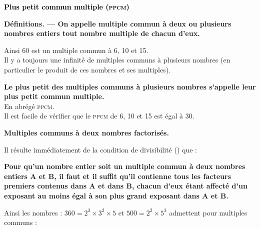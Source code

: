 \usepackage{amsmath,bm}
\usepackage[tikz]{bclogo}





\newcommand{\titre}[1]{\begin{center}{\Large\textcolor{Black}{#1}}\end{center}}

\newcommand{\paragraphe}[1]{\large\textcolor{blue}{#1}}

\newcommand{\NBVert}[1]{\large\textcolor{DarkGreen}{#1}}

\newcommand{\Attention}[3]{
\begin{bclogo}[%
barre = none,
couleurBord=white,%
logo=\bcattention,%
margeG = -1,%
margeD = 1,%
marge = 15%
]{\textcolor{#1}{$\quad$ #2}}
#3
\end {bclogo}
}

\titre{\bf Plus petit commun multiple (\textsc{ppcm})}
 

\textbf{Définitions. — On appelle multiple commun à deux ou plusieurs nombres entiers tout nombre multiple de chacun d'eux.} 

Ainsi 60 est un multiple commun à 6, 10 et 15. \\
Il y a toujours une infinité de multiples communs à plusieurs nombres (en particulier le produit de ces nombres et ses multiples).

\textbf{ Le plus petit des multiples communs à plusieurs nombres s'appelle leur plus petit commun multiple.}\\ 
En abrégé \textsc{ppcm}.\\
 Il est facile de vérifier que le  \textsc{ppcm} de 6, 10 et 15 est égal à 30. 
 
\textbf{ Multiples communs à deux nombres factorisés.} \label{Multiples_communs}

 Il résulte immédiatement de la condition de divisibilité (\label{Quotient_exact}) que : 
 
\textbf{  Pour qu'un nombre entier soit un multiple commun à deux nombres entiers A et B, il faut et il suffit qu'il contienne tous les facteurs premiers contenus dans A et dans B, chacun d'eux étant affecté d'un exposant au moins égal à son plus grand exposant dans A et B. } 

Ainsi les nombres : $360 =2^3 \times 3^2 \times  5$  et $500 = 2^2 \times  5^3$ admettent pour multiples communs : \\

